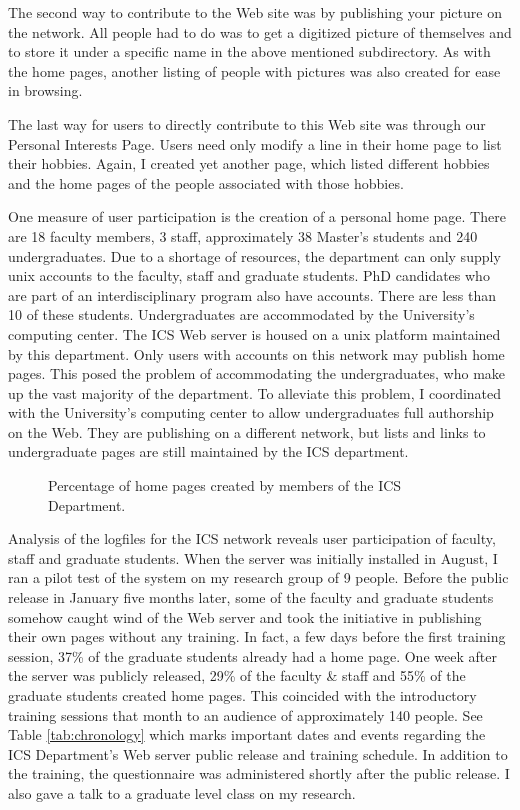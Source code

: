 The second way to contribute to the Web site was by publishing your picture on
the network.  All people had to do was to get a digitized picture of themselves
and to store it under a specific name in the above mentioned subdirectory.  As
with the home pages, another listing of people with pictures was also created
for ease in browsing.  

The last way for users to directly contribute to this Web site was through our
Personal Interests Page.  Users need only modify a line in their home page to
list their hobbies.  Again, I created yet another page, which listed different
hobbies and the home pages of the people associated with those hobbies.

One measure of user participation is the creation of a personal home page.
There are 18 faculty members, 3 staff, approximately 38 Master's students and
240 undergraduates.  Due to a shortage of resources, the department can only
supply unix accounts to the faculty, staff and graduate students.  PhD
candidates who are part of an interdisciplinary program also have accounts.
There are less than 10 of these students.  Undergraduates are accommodated by
the University's computing center.  The ICS Web server is housed on a unix
platform maintained by this department.  Only users with accounts on this
network may publish home pages.  This posed the problem of accommodating the
undergraduates, who make up the vast majority of the department.  To alleviate
this problem, I coordinated with the University's computing center to allow
undergraduates full authorship on the Web.  They are publishing on a different
network, but lists and links to undergraduate pages are still maintained by the
ICS department.

\begin{figure}[htb]
\centerline{}
\caption{Percentage of home pages created by members of the ICS Department.}
\label{fig:HomePages}
\end{figure}

Analysis of the logfiles for the ICS network reveals user participation of
faculty, staff and graduate students.  When the server was initially installed
in August, I ran a pilot test of the system on my research group of 9 people.
Before the public release in January five months later, some of the faculty and
graduate students somehow caught wind of the Web server and took the initiative
in publishing their own pages without any training.  In fact, a few days before
the first training session, 37\% of the graduate students already had a home
page.  One week after the server was publicly released, 29\% of the faculty \&
staff and 55\% of the graduate students created home pages.  This coincided
with the introductory training sessions that month to an audience of
approximately 140 people.  See Table \ref{tab:chronology} which marks important
dates and events regarding the ICS Department's Web server public release and
training schedule.  In addition to the training, the questionnaire was
administered shortly after the public release.  I also gave a talk to a
graduate level class on my research.

